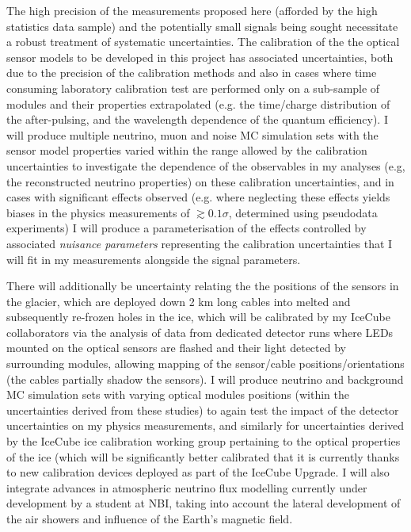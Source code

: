 \documentclass[a4paper,11pt]{article}
\begin{document}
The high precision of the measurements proposed here (afforded by the high statistics data sample) and the potentially small signals being sought necessitate a robust treatment of systematic uncertainties. The calibration of the 
the optical sensor models to be developed in this project has associated uncertainties, both due to the precision of the calibration methods and also in cases where time consuming laboratory calibration test are performed only on a sub-sample of modules and their properties extrapolated (e.g. the time/charge distribution of the after-pulsing, and the wavelength dependence of the quantum efficiency). I will produce multiple neutrino, muon and noise MC simulation sets with the sensor model properties varied within the range allowed by the calibration uncertainties to investigate the dependence of the observables in my analyses (e.g, the reconstructed neutrino properties) on these calibration uncertainties, and in cases with significant effects observed (e.g. where neglecting these effects yields biases in the physics measurements of $\gtrsim 0.1 \sigma$, determined using pseudodata experiments) I will produce a parameterisation of the effects controlled by associated \textit{nuisance parameters} representing the calibration uncertainties that I will fit in my measurements alongside the signal parameters.

There will additionally be uncertainty relating the the positions of the sensors in the glacier, which are deployed down 2 km long cables into melted and subsequently re-frozen holes in the ice, which will be calibrated by my IceCube collaborators via the analysis of data from dedicated detector runs where LEDs mounted on the optical sensors are flashed and their light detected by surrounding modules, allowing mapping of the sensor/cable positions/orientations (the cables partially shadow the sensors). I will produce neutrino and background MC simulation sets with varying optical modules positions (within the uncertainties derived from these studies) to again test the impact of the detector uncertainties on my physics measurements, and similarly for uncertainties derived by the IceCube ice calibration working group pertaining to the optical properties of the ice (which will be significantly better calibrated that it is currently thanks to new calibration devices deployed as part of the IceCube Upgrade. I will also integrate advances in atmospheric neutrino flux modelling currently under development by a student at NBI, taking into account the lateral development of the air showers and influence of the Earth's magnetic field.
\end{document}
